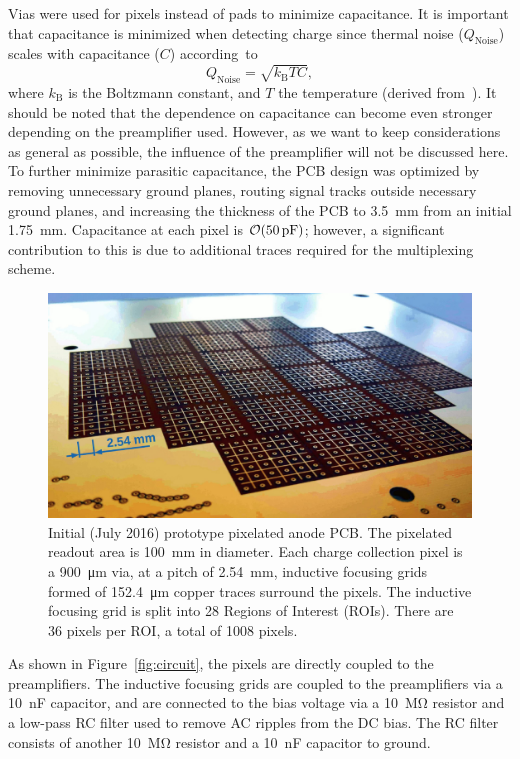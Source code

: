 \documentclass[instruments,article,accept,moreauthors,pdftex]{Definitions/mdpi}
\begin{document}
Vias were used for pixels instead of pads to minimize capacitance.
It is important that capacitance is minimized when detecting charge since thermal noise ($Q_{\mathrm{Noise}}$) scales with capacitance ($C$) according~to
\begin{equation}
	Q_{\mathrm{Noise}} = \sqrt{k_{\mathrm{B}}TC} \mathrm{,}
\end{equation}
where $k_{\mathrm{B}}$ is the Boltzmann constant, and $T$ the temperature (derived from~\cite{noise}).
It should be noted that the dependence on capacitance can become even stronger depending on the preamplifier used.
However, as we want to keep considerations as general as possible, the influence of the preamplifier will not be discussed here.
To further minimize parasitic capacitance, the PCB design was optimized by removing unnecessary ground planes, routing signal tracks outside necessary ground planes, and increasing the thickness of the PCB to \SI{3.5}{\milli\metre} from an initial \SI{1.75}{\milli\metre}. 
Capacitance at each pixel is $\order{\SI{50}{\pico\farad}}$; however, a significant contribution to this is due to additional traces required for the multiplexing scheme.

\begin{figure}[H]
	\centering
	\includegraphics[width=0.65\linewidth]{Figures/pixies.jpg}
	\caption{Initial (July 2016) prototype pixelated anode PCB. The pixelated readout area is \SI{100}{\milli\metre} in diameter.
		Each charge collection pixel is a \SI{900}{\micro\metre} via, at a pitch of \SI{2.54}{\milli\metre}, inductive focusing grids formed of \SI{152.4}{\micro\metre} copper traces surround the pixels. The inductive focusing grid is split into 28 Regions of Interest (ROIs). There are 36 pixels per ROI, a total of 1008 pixels.}
	\label{fig:pixies}
\end{figure}

As shown in Figure~\ref{fig:circuit}, the pixels are directly coupled to the preamplifiers.
The inductive focusing grids are coupled to the preamplifiers via a \SI{10}{\nano\farad} capacitor, and are connected to the bias voltage via a \SI{10}{\mega\ohm} resistor and a low-pass RC filter used to remove AC ripples from the DC bias. 
The RC filter consists of another \SI{10}{\mega\ohm} resistor and a \SI{10}{\nano\farad} capacitor to ground.   
\end{document}
